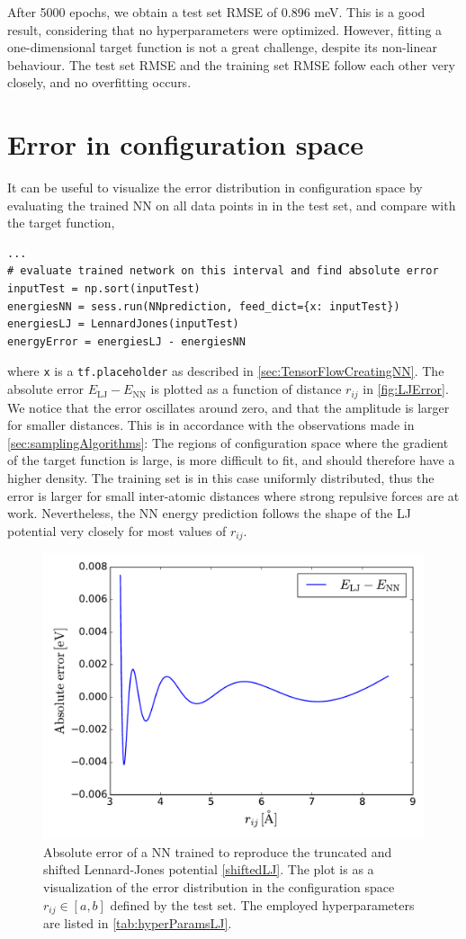 \documentclass[twoside,english]{uiofysmaster}
\begin{document}
After 5000 epochs, we obtain a test set RMSE of 0.896 meV. This is a good result, considering that no hyperparameters 
were optimized. However, fitting a one-dimensional target function is not a great challenge, despite its non-linear behaviour. 
The test set RMSE and the training set RMSE follow each other very closely, and no overfitting occurs. 

\section{Error in configuration space}
It can be useful to visualize the error distribution in configuration space 
by evaluating the trained NN on all data points in in the test set, and compare with the target function, 
\begin{verbatim}
...
# evaluate trained network on this interval and find absolute error
inputTest = np.sort(inputTest)
energiesNN = sess.run(NNprediction, feed_dict={x: inputTest})
energiesLJ = LennardJones(inputTest)
energyError = energiesLJ - energiesNN
\end{verbatim}
where \texttt{x} is a \texttt{tf.placeholder} as described in \autoref{sec:TensorFlowCreatingNN}. 
The absolute error $E_\mathrm{LJ} - E_\mathrm{NN}$ is plotted as a function of distance $r_{ij}$ in \autoref{fig:LJError}.
We notice that the error oscillates around zero, and that the amplitude is larger for smaller distances.
This is in accordance with the observations made in \autoref{sec:samplingAlgorithms}: The regions of configuration space 
where the gradient of the target function is large, is more difficult to fit, and should therefore have a higher density. 
The training set is in this case uniformly distributed, thus the error is larger for small inter-atomic distances where 
strong repulsive forces are at work. Nevertheless, the NN energy prediction follows the shape of the LJ potential very closely
for most values of $r_{ij}$. 
\begin{figure}
\centering
  \includegraphics[width = 0.7\linewidth]{Figures/Implementation/LJError.pdf}
  \caption{Absolute error of a NN trained to reproduce the truncated and shifted Lennard-Jones potential \eqref{shiftedLJ}. 
           The plot is as a visualization of the error distribution in the configuration space $r_{ij} \in [a,b]$ 
           defined by the test set. The employed hyperparameters are listed in \autoref{tab:hyperParamsLJ}.} 
  \label{fig:LJError}
\end{figure}
\end{document}
